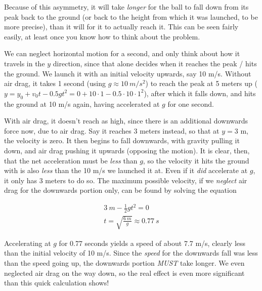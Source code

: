 Because of this asymmetry, it will take \emph{longer} for the ball to fall down from its peak back to the ground (or back to the height from which it was launched, to be more precise), than it will for it to actually reach it. This can be seen fairly easily, at least once you know how to think about the problem.

We can neglect horizontal motion for a second, and only think about how it travels in the $y$ direction, since that alone decides when it reaches the peak / hits the ground. We launch it with an initial velocity upwards, say 10 m/s. Without air drag, it takes 1 second (using $g \approx \SI{10}{m/s^2}$) to reach the peak at 5 meters up ($y = y_0 + v_0t - 0.5 g t^2 = 0 + 10\cdot1 - 0.5\cdot10\cdot1^2$), after which it falls down, and hits the ground at 10 m/s again, having accelerated at $g$ for one second.

With air drag, it doesn't reach as high, since there is an additional downwards force now, due to air drag. Say it reaches 3 meters instead, so that at $y = 3$ m, the velocity is zero. It then begins to fall downwards, with gravity pulling it down, and air drag pushing it upwards (opposing the motion). It is clear, then, that the net acceleration must be \emph{less} than $g$, so the velocity it hits the ground with is also \emph{less} than the 10 m/s we launched it at. Even if it \emph{did} accelerate at $g$, it only has 3 meters to do so. The maximum possible velocity, if we \emph{neglect} air drag for the downwards portion only, can be found by solving the equation

\begin{align}
\SI{3}{m} - \frac{1}{2} g t^2 = 0\\
t = \sqrt{\frac{\SI{6}{m}}{g}} \approx \SI{0.77}{s}
\end{align}

Accelerating at $g$ for 0.77 seconds yields a speed of about 7.7 m/s, clearly less than the initial velocity of 10 m/s. Since the \emph{speed} for the downwards fall was less than the speed going up, the downwards portion \emph{MUST} take longer. We even neglected air drag on the way down, so the real effect is even more significant than this quick calculation shows!

